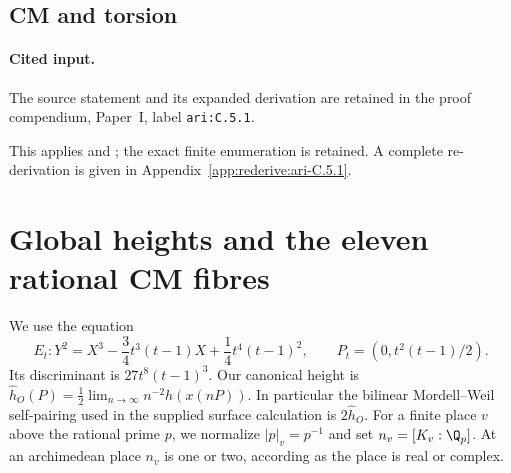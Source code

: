 \subsection{CM and torsion}

\paragraph{Cited input.} \label{ari:C.5.1}The source statement and its expanded derivation are retained in the proof compendium, Paper~I, label \nolinkurl{ari:C.5.1}.\par



This applies \citet[Theorem~4.15]{BourdonClarkStankewicz2017} and \citet[Theorem~20.12 and Corollary~20.13]{Sutherland2023CM}; the exact finite enumeration is retained. A complete re-derivation is given in Appendix~\ref{app:rederive:ari-C.5.1}.



\section{Global heights and the eleven rational CM fibres}

We use the equation
\[
 E_t:Y^2=X^3-\frac34t^3(t-1)X+\frac14t^4(t-1)^2,
 \qquad P_t=(0,t^2(t-1)/2).
\]
Its discriminant is $27t^8(t-1)^3$. Our canonical height is
$\widehat h_O(P)=\frac12\lim_{n\to\infty}n^{-2}h(x(nP))$.
In particular the bilinear Mordell--Weil self-pairing used in the
supplied surface calculation is $2\widehat h_O$.
For a finite place $v$ above the rational prime $p$, we normalize
$|p|_v=p^{-1}$ and set $n_v=[K_v:\Q_p]$. At an archimedean
place $n_v$ is one or two, according as the place is real or complex.

